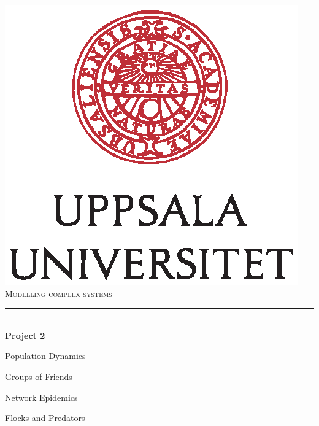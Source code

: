 \documentclass[12pt]{article}
\begin{document}
\begin{titlepage}

\newcommand{\HRule}{\rule{\linewidth}{0.5mm}} %

\center %
 

\includegraphics{UU_logo.eps}\\[0.5cm] %
 
\textsc{\huge Modelling complex systems}\\[0.5cm] %



\HRule \\[0.4cm]
{\huge \bfseries Project 2}\\[0.2cm] %
{\Large Population Dynamics \par Groups of Friends \par Network Epidemics \par Flocks and Predators }
\\


\end{titlepage}
\end{document}
